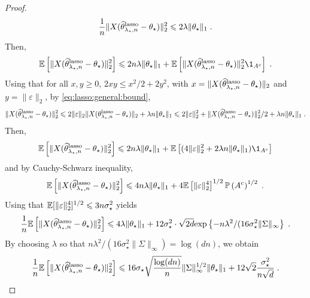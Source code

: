 \begin{proof}
$$\frac{1}{n}\|X(\widehat{\theta}^{\mathrm{lasso}}_{\lambda_\star,n}-\theta_\star)\|_2^2  \leqslant 2\lambda \|\theta_\star\|_1 \;.
$$
Then,
\begin{align*}
\bE\left[\|X(\widehat\param^{\mathrm{lasso}}_{\lambda_\star,n}-\param_\star)\|_2^2\right] \leqslant 2 n \lambda \|\param_\star\|_1 + \bE\left[\|X(\widehat\param^{\mathrm{lasso}}_{\lambda_\star,n}-\param_\star)\|_2^2 \1_{A^c}\right]\eqsp.
\end{align*}
Using that for all $x,y\geq 0$, $2xy\leq x^2/2 + 2y^2$, with  $x= \|X(\widehat{\theta}^{\mathrm{lasso}}_{\lambda_\star,n}-\theta_\star)\|_2$ and $y=\|\varepsilon \|_2$, by \eqref{eq:lasso:general:bound}, 
$$
\|X(\widehat{\theta}^{\mathrm{lasso}}_{\lambda_\star,n}-\theta_\star)\|_2^2 \leqslant 2 \|\varepsilon \|_2 \|X(\theta^{\mathrm{lasso}}_{\lambda_\star,n}-\theta_\star)\|_2 + \lambda n \|\theta_\star\|_1 \leqslant  2\|\varepsilon \|_2^2 +  \|X(\widehat{\theta}^{\mathrm{lasso}}_{\lambda_\star,n}-\theta_\star)\|_2^2/2 + \lambda n \|\theta_\star\|_1\;.
$$ 
Then,
$$
\bE\left[\|X(\widehat\param^{\mathrm{lasso}}_{\lambda_\star,n}-\param_\star)\|_2^2\right] \leqslant 2 n \lambda \|\param_\star\|_1 + \bE\left[ (4\|\varepsilon \|_2^2 + 2\lambda n \|\param_\star\|_1) \1_{A^c}\right]
$$
and by Cauchy-Schwarz inequality,
$$
\mathbb{E}\left[\|X(\widehat{\theta}^{\mathrm{lasso}}_{\lambda_\star,n}-\theta_\star)\|_2^2\right] \leqslant 4 n \lambda \|\theta_\star\|_1 + 4\mathbb{E}\left[\|\varepsilon \|_2^4\right]^{1/2} \mathbb{P}\left(A^c\right)^{1/2}\;.
$$
Using that $\mathbb{E}[\|\varepsilon \|_2^4]^{1/2}\leqslant 3n\sigma_\star^2$ yields
$$
\frac{1}{n}\mathbb{E}\left[\|X(\widehat{\theta}^{\mathrm{lasso}}_{\lambda_\star,n}-\theta_\star)\|_2^2\right] \leqslant  4\lambda \|\theta_\star\|_1  + 12\sigma_\star^2 \cdot \sqrt{2 d}\mathrm{exp}\left\{-n\lambda^2/(16\sigma_\star^2  \|\Sigma\|_\infty\right\}\;.
$$
By choosing $\lambda$ so that $n\lambda^2/(16\sigma_\star^2  \|\Sigma\|_\infty) = \log(dn)$, we obtain
$$
\frac{1}{n}\mathbb{E}\left[\|X(\widehat{\theta}^{\mathrm{lasso}}_{\lambda_\star,n}-\theta_\star)\|_2^2\right] \leqslant  16\sigma_\star\sqrt{\frac{\log(dn)}{n}}\|\Sigma\|_\infty^{1/2}\|\theta_\star\|_1  + 12\sqrt{2}\frac{\sigma_\star^2}{n\sqrt{d}} \;.
$$
\end{proof}

